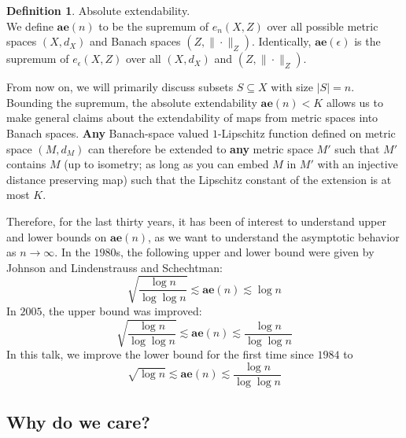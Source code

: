 \documentclass[10pt]{article}
\theoremstyle{definition}
\newtheorem{definition}[theorem]{Definition}
\theoremstyle{definition}
\theoremstyle{definition}
\theoremstyle{definition}
\begin{document}
\begin{definition} Absolute extendability. \\
We define $\textbf{ae}(n)$ to be the supremum of $e_n(X, Z)$ over all possible metric spaces $(X, d_X)$ and Banach spaces $(Z, \|\cdot\|_Z)$.
Identically, $\textbf{ae}(\epsilon)$ is the supremum of $e_{\epsilon}(X, Z)$ over all $(X, d_X)$ and $(Z, \|\cdot\|_Z)$. 
\end{definition}

From now on, we will primarily discuss subsets $S \subseteq X$ with size $|S| = n$. 
Bounding the supremum, the absolute extendability $\textbf{ae}(n) < K$ allows us to make general claims about the extendability of maps from metric spaces into Banach spaces. \textbf{Any} Banach-space valued $1$-Lipschitz function defined on metric space $(M, d_M)$ can therefore be extended to \textbf{any} metric space $M'$ such that $M'$ contains $M$ (up to isometry; as long as you can embed $M$ in $M'$ with an injective distance preserving map) such that the Lipschitz constant of the extension is at most $K$. 

Therefore, for the last thirty years, it has been of interest to understand upper and lower bounds on $\textbf{ae}(n)$, as we want to understand the asymptotic behavior as $n \to \infty$. In the $1980$s, the following upper and lower bound were given by Johnson and Lindenstrauss and Schechtman:
\[
\sqrt{\frac{\log n}{\log \log n}} \lesssim \textbf{ae}(n) \lesssim \log n
\]
In $2005$, the upper bound was improved:
\[
\sqrt{\frac{\log n}{\log \log n}} \lesssim \textbf{ae}(n) \lesssim \frac{\log n}{\log \log n}
\]
In this talk, we improve the lower bound for the first time since $1984$ to
\[
\sqrt{\log n} \lesssim \textbf{ae}(n) \lesssim \frac{\log n}{\log \log n}
\]

\subsection{Why do we care?}
\end{document}
